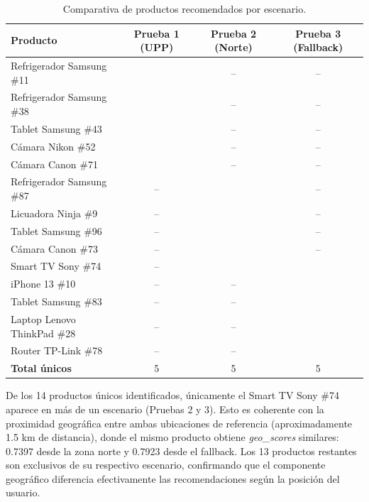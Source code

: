 \documentclass[11pt, letterpaper]{article}
\begin{document}
	\begin{table}[H]
		\centering
		\caption{Comparativa de productos recomendados por escenario.}
		\label{tab:comparativa}
		\begin{tabular}{lccc}
			\hline
			\textbf{Producto}           & \textbf{Prueba 1 (UPP)} & \textbf{Prueba 2 (Norte)} & \textbf{Prueba 3 (Fallback)} \\
			\hline
			Refrigerador Samsung \#11   & \checkmark & --         & --         \\
			Refrigerador Samsung \#38   & \checkmark & --         & --         \\
			Tablet Samsung \#43         & \checkmark & --         & --         \\
			Cámara Nikon \#52           & \checkmark & --         & --         \\
			Cámara Canon \#71           & \checkmark & --         & --         \\
			Refrigerador Samsung \#87   & --         & \checkmark & --         \\
			Licuadora Ninja \#9         & --         & \checkmark & --         \\
			Tablet Samsung \#96         & --         & \checkmark & --         \\
			Cámara Canon \#73           & --         & \checkmark & --         \\
			Smart TV Sony \#74          & --         & \checkmark & \checkmark \\
			iPhone 13 \#10              & --         & --         & \checkmark \\
			Tablet Samsung \#83         & --         & --         & \checkmark \\
			Laptop Lenovo ThinkPad \#28 & --         & --         & \checkmark \\
			Router TP-Link \#78         & --         & --         & \checkmark \\
			\hline
			\textbf{Total únicos}       & 5          & 5          & 5          \\
			\hline
		\end{tabular}
	\end{table}
	
	De los 14 productos únicos identificados, únicamente el Smart TV Sony
	\#74 aparece en más de un escenario (Pruebas 2 y 3). Esto es coherente
	con la proximidad geográfica entre ambas ubicaciones de referencia
	(aproximadamente 1.5 km de distancia), donde el mismo producto obtiene
	\textit{geo\_scores} similares: 0.7397 desde la zona norte y 0.7923
	desde el fallback. Los 13 productos restantes son exclusivos de su
	respectivo escenario, confirmando que el componente geográfico diferencia
	efectivamente las recomendaciones según la posición del usuario.
	
\end{document}
